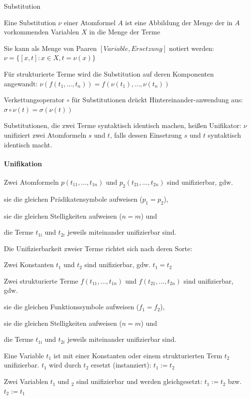 \documentclass[a4paper]{article}
\begin{document}
\begin{multicols}{3}
  Substitution
  \begin{itemize*}
    \item Eine Substitution $\nu$ einer Atomformel $A$ ist eine Abbildung der Menge der in $A$ vorkommenden Variablen $X$ in die Menge der Terme
    \item Sie kann als Menge von Paaren $[Variable,Ersetzung]$ notiert werden: $\nu=\{[x,t]: x\in X, t=\nu(x)\}$
    \item Für strukturierte Terme wird die Substitution auf deren Komponenten angewandt: $\nu(f(t_1,...,t_n)) = f(\nu(t_1),...,\nu(t_n))$
    \item Verkettungsoperator $\circ$ für Substitutionen drückt Hintereinander-anwendung aus: $\sigma\circ\nu(t)=\sigma(\nu(t))$
    \item Substitutionen, die zwei Terme syntaktisch identisch machen, heißen Unifikator: $\nu$unifiziert zwei Atomformeln $s$ und $t$, falls dessen Einsetzung $s$ und $t$ syntaktisch identisch macht.
  \end{itemize*}

  \paragraph{Unifikation}
  Zwei Atomformeln $p(t_{11},...,t_{1n})$ und $p_2(t_{21},...,t_{2n})$ sind unifizierbar, gdw.
  \begin{itemize*}
    \item sie die gleichen Prädikatensymbole aufweisen ($p_1= p_2$),
    \item sie die gleichen Stelligkeiten aufweisen ($n = m$) und
    \item die Terme $t_{1i}$ und $t_{2i}$ jeweils miteinander unifizierbar sind.
  \end{itemize*}

  Die Unifizierbarkeit zweier Terme richtet sich nach deren Sorte:
  \begin{enumerate*}
    \item Zwei Konstanten $t_1$ und $t_2$ sind unifizierbar, gdw. $t_1= t_2$
    \item Zwei strukturierte Terme $f(t_{11},...,t_{1n})$ und $f(t_{21},...,t_{2n})$ sind unifizierbar, gdw.
    \begin{itemize*}
      \item sie die gleichen Funktionssymbole aufweisen ($f_1= f_2$),
      \item sie die gleichen Stelligkeiten aufweisen ($n=m$) und
      \item die Terme $t_{1i}$ und $t_{2i}$ jeweils miteinander unifizierbar sind.
    \end{itemize*}
    \item Eine Variable $t_1$ ist mit einer Konstanten oder einem strukturierten Term $t_2$ unifizierbar. $t_1$ wird durch $t_2$ ersetzt (instanziert): $t_1:= t_2$
    \item Zwei Variablen $t_1$ und $_2$ sind unifizierbar und werden gleichgesetzt: $t_1:=t_2$ bzw. $t_2:= t_1$
  \end{enumerate*}


\end{multicols}
\end{document}
